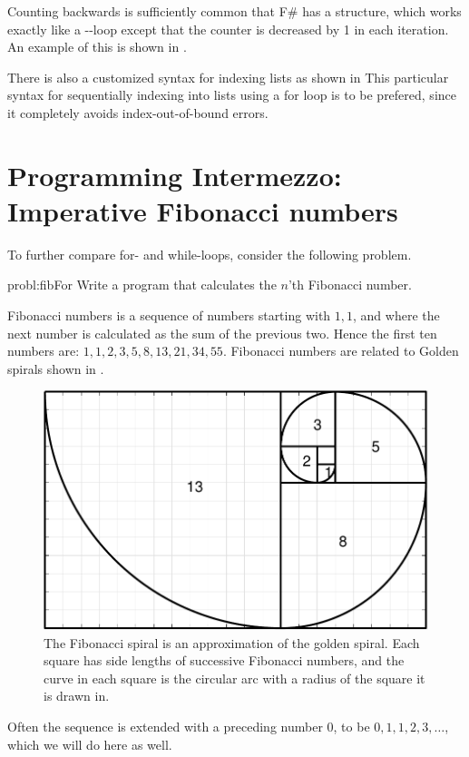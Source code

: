 \documentclass[fsharpNotes.tex]{subfiles}
\begin{document}
Counting backwards is sufficiently common that F\# has a  structure, which works exactly like a --loop except that the counter is decreased by 1 in each iteration. An example of this is shown in .
%
%

There is also a customized syntax for indexing lists as shown in 
%
%
This particular syntax for sequentially indexing into lists using a for loop is to be prefered, since it completely avoids index-out-of-bound errors.

\section{Programming Intermezzo: Imperative Fibonacci numbers}
To further compare for- and while-loops, consider the following problem.
\begin{task}{probl:fibFor}
  Write a program that calculates the $n$'th Fibonacci number.
\end{task}
Fibonacci numbers is a sequence of numbers starting with $1, 1$, and where the next number is calculated as the sum of the previous two. Hence the first ten numbers are: $1, 1, 2, 3, 5, 8, 13, 21, 34, 55$. Fibonacci numbers are related to Golden spirals shown in .
\begin{figure}
  \centering
  \includegraphics[width=0.45\linewidth]{Fibonacci_spiral}
  \caption{The Fibonacci spiral is an approximation of the golden spiral. Each square has side lengths of successive Fibonacci numbers, and the curve in each square is the circular arc with a radius of the square it is drawn in.}
  \label{fig:goldenSpiral}
\end{figure}
Often the sequence is extended with a preceding number $0$, to be $0, 1, 1, 2, 3, \dots$, which we will do here as well.
\end{document}
